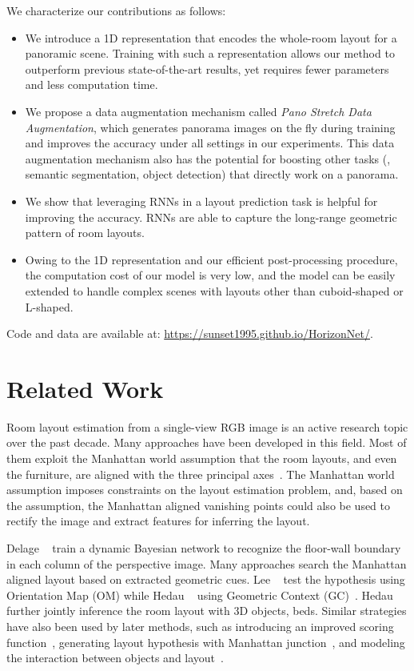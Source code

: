\documentclass[10pt,twocolumn,letterpaper]{article}
\begin{document}
We characterize our contributions as follows:
\begin{itemize}
    \item We introduce a 1D  representation that encodes the whole-room layout for a panoramic scene. Training with such a representation allows our method to outperform previous state-of-the-art results, yet requires fewer parameters and less computation time.
    \item We propose a data augmentation mechanism called \textit{Pano Stretch Data Augmentation}, which generates panorama images on the fly during training and improves the accuracy under all settings in our experiments. This data augmentation mechanism also has the potential for boosting other tasks (\eg, semantic segmentation, object detection) that directly work on a panorama.
    \item We show that leveraging RNNs in a layout prediction task is helpful for improving the accuracy. RNNs are able to capture the long-range geometric pattern of room layouts.
    \item Owing to the 1D representation and our efficient post-processing procedure, the computation cost of our model is very low, and the model can be easily extended to handle complex scenes with layouts other than cuboid-shaped or L-shaped.
\end{itemize}

\noindent Code and data are available at: \url{https://sunset1995.github.io/HorizonNet/}.
 
\section{Related Work}

Room layout estimation from a single-view RGB image is an active research topic over the past decade. Many approaches have been developed in this field. Most of them exploit the Manhattan world assumption that the room layouts, and even the furniture, are aligned with the three principal axes~\cite{coughlan1999manhattan}. The Manhattan world assumption imposes constraints on the layout estimation problem, and, based on the assumption, the Manhattan aligned vanishing points could also be used to rectify the image and extract features for inferring the layout.

Delage \etal~\cite{delage2006dynamic} train a dynamic Bayesian network to recognize the floor-wall boundary in each column of the perspective image. Many approaches search the Manhattan aligned layout based on extracted geometric cues. Lee \etal~\cite{lee2009geometric} test the hypothesis using Orientation Map (OM) while Hedau \etal~\cite{hedau2009recovering} using Geometric Context (GC)~\cite{hoiem2007recovering}. Hedau \etal~\cite{gupta2010estimating} further jointly inference the room layout with 3D objects, \eg beds. Similar strategies have also been used by later methods, such as introducing an improved scoring function~\cite{schwing2012efficient,urtasun2012efficient}, generating layout hypothesis with Manhattan junction~\cite{ramalingam2013manhattan}, and modeling the interaction between objects and layout~\cite{del2013understanding,gupta2010estimating,zhao2013scene}.
\end{document}
